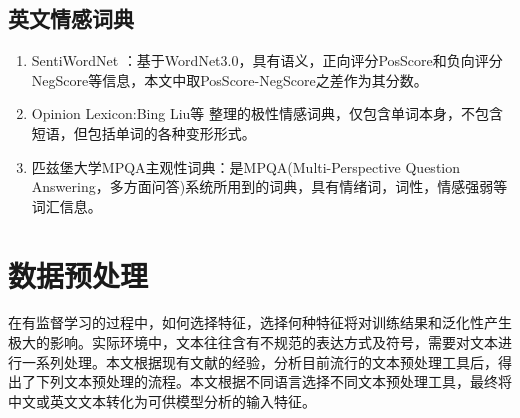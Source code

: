 \subsection{英文情感词典}
\begin{enumerate}
\item SentiWordNet\cite{sentiwordnet} \cite{sentiwordnet3}：基于WordNet3.0，具有语义，正向评分PosScore和负向评分NegScore等信息，本文中取PosScore-NegScore之差作为其分数。
\item Opinion Lexicon:Bing Liu等\cite{huliu2004a} \cite{huliu05a} 整理的极性情感词典，仅包含单词本身，不包含短语，但包括单词的各种变形形式。
\item 匹兹堡大学MPQA主观性词典\cite{mpqa}：是MPQA(Multi-Perspective Question Answering，多方面问答)系统所用到的词典，具有情绪词，词性，情感强弱等词汇信息。
\end{enumerate}

\section{数据预处理}
在有监督学习的过程中，如何选择特征，选择何种特征将对训练结果和泛化性产生极大的影响。实际环境中，文本往往含有不规范的表达方式及符号，需要对文本进行一系列处理。本文根据现有文献的经验，分析目前流行的文本预处理工具后，得出了下列文本预处理的流程。本文根据不同语言选择不同文本预处理工具，最终将中文或英文文本转化为可供模型分析的输入特征。

